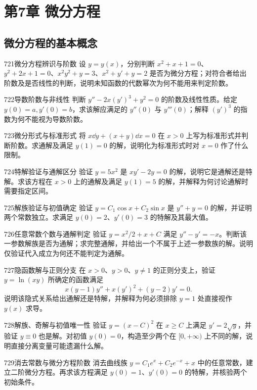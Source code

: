 \section{第7章 微分方程}
\subsection{微分方程的基本概念}
\begin{exercise}{721}{微分方程辨识与阶数}
设 $y=y(x)$，分别判断 $x^2+x+1=0$、$y^2+2x+1=0$、$x^2y^2+y=3$、$x^2+y'+y=2$ 是否为微分方程；对符合者给出阶数及是否线性的判断，说明未知函数的代数幂次为何不能用来判定阶数。
\end{exercise}
\begin{exercise}{722}{导数阶数与非线性}
判断 $y''-2x(y')^3+y^2=0$ 的阶数及线性性质。给定 $y(0)=a,y'(0)=b$，求该解应满足的 $y''(0)$ 与 $y'''(0)$；解释 $(y')^3$ 的指数为何不能视为导数阶数。
\end{exercise}
\begin{exercise}{723}{微分形式与标准形式}
将 $x\dd y+(x+y)\dd x=0$ 在 $x>0$ 上写为标准形式并判断阶数。求通解及满足 $y(1)=0$ 的解，说明化为标准形式时对 $x=0$ 作了什么限制。
\end{exercise}
\begin{exercise}{724}{特解验证与通解区分}
验证 $y=5x^2$ 是 $xy'-2y=0$ 的解，说明它是通解还是特解。求该方程在 $x>0$ 上的通解及满足 $y(1)=5$ 的解，并解释为何讨论通解时需要指定区间。
\end{exercise}
\begin{exercise}{725}{解族验证与初值确定}
验证 $y=C_1\cos x+C_2\sin x$ 是 $y''+y=0$ 的解，并证明两个常数独立。求满足 $y(0)=2$、$y'(0)=3$ 的特解及其最大值。
\end{exercise}
\begin{exercise}{726}{任意常数个数与通解判定}
验证 $y=x^2/2+x+C$ 满足 $y''-y'=-x$。判断该一参数解族是否为通解；求完整通解，并给出一个不属于上述一参数族的解。说明仅验证代入成立为何还不能判定为通解。
\end{exercise}
\begin{exercise}{727}{隐函数解与正则分支}
在 $x>0$、$y>0$、$y\ne1$ 的正则分支上，验证 $y=\ln(xy)$ 所确定的函数满足
\[
x(y-1)y''+x(y')^2+(y-2)y'=0.
\]
说明该隐式关系给出通解还是特解，并解释为何必须排除 $y=1$ 处直接视作 $y(x)$ 求导。
\end{exercise}
\begin{exercise}{728}{解族、奇解与初值唯一性}
验证 $y=(x-C)^2$ 在 $x\ge C$ 上满足 $y'=2\sqrt y$，并验证 $y\equiv0$ 也是解。对初值 $y(0)=0$，构造至少两个在 $[0,+\infty)$ 上不同的解，说明直接分离变量可能遗漏什么解。
\end{exercise}
\begin{exercise}{729}{消去常数与微分方程阶数}
消去曲线族 $y=C_1e^x+C_2e^{-x}+x$ 中的任意常数，建立二阶微分方程。再求该方程满足 $y(0)=1$、$y'(0)=0$ 的特解，并核验两个初始条件。
\end{exercise}
